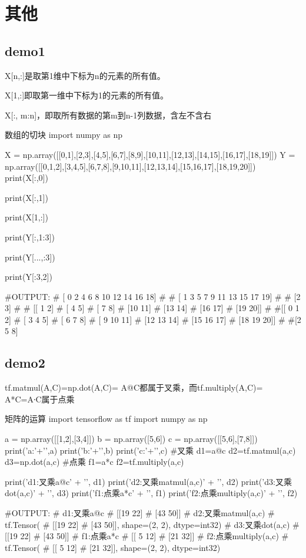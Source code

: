 \documentclass[11pt]{article}
\begin{document}
\section{其他}
\subsection{demo1}
X[n,:]是取第1维中下标为n的元素的所有值。

X[1,:]即取第一维中下标为1的元素的所有值。

X[:,  m:n]，即取所有数据的第m到n-1列数据，含左不含右
\begin{Python}{数组的切块}
import numpy as np

X = np.array([[0,1],[2,3],[4,5],[6,7],[8,9],[10,11],[12,13],[14,15],[16,17],[18,19]])
Y = np.array([[0,1,2],[3,4,5],[6,7,8],[9,10,11],[12,13,14],[15,16,17],[18,19,20]])
print(X[:,0])

print(X[:,1])

print(X[1,:])

print(Y[:,1:3])

print(Y[...,:3])

print(Y[:3,2])

#OUTPUT:
#       [ 0  2  4  6  8 10 12 14 16 18]
#
#       [ 1  3  5  7  9 11 13 15 17 19]
#
# [2 3]
#
# [[ 1  2]
#  [ 4  5]
#  [ 7  8]
#  [10 11]
#  [13 14]
#  [16 17]
#  [19 20]]
#
#[[ 0  1  2]
# [ 3  4  5]
# [ 6  7  8]
# [ 9 10 11]
# [12 13 14]
# [15 16 17]
# [18 19 20]]
#
#[2 5 8]
\end{Python}
\subsection{demo2}
tf.matmul(A,C)=np.dot(A,C)= A@C都属于叉乘，而tf.multiply(A,C)= A*C=A∙C属于点乘
\begin{Python}{矩阵的运算}
import tensorflow as tf
import numpy as np

a = np.array([[1,2],[3,4]])
b = np.array([5,6])
c = np.array([[5,6],[7,8]])
print('a:'+'\n',a)
print('b:'+'\n',b)
print('c:'+'\n',c)
#叉乘
d1=a@c
d2=tf.matmul(a,c)
d3=np.dot(a,c)
#点乘
f1=a*c
f2=tf.multiply(a,c)

print('d1:叉乘a@c' + '\n', d1)
print('d2:叉乘matmul(a,c)' + '\n', d2)
print('d3:叉乘dot(a,c)' + '\n', d3)
print('f1:点乘a*c' + '\n', f1)
print('f2:点乘multiply(a,c)' + '\n', f2)

#OUTPUT:
#       d1:叉乘a@c
#           [[19 22]
#            [43 50]]
#       d2:叉乘matmul(a,c)
#           tf.Tensor(
#               [[19 22]
#                [43 50]], shape=(2, 2), dtype=int32)
#       d3:叉乘dot(a,c)
#           [[19 22]
#            [43 50]]
#       f1:点乘a*c
#           [[ 5 12]
#            [21 32]]
#       f2:点乘multiply(a,c)
#           tf.Tensor(
#               [[ 5 12]
#                [21 32]], shape=(2, 2), dtype=int32)
\end{Python}
\end{document}
